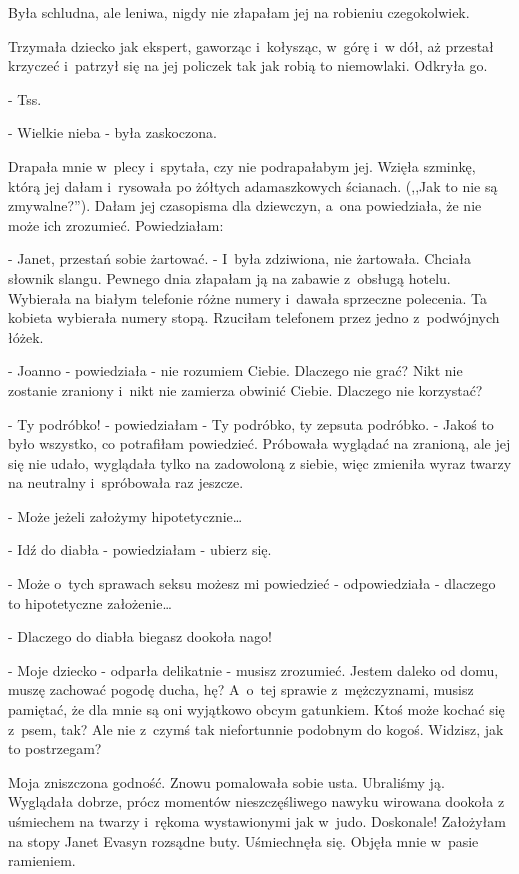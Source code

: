 \documentclass[oneside,polish,12pt,sfheadings]{mwbk}
\begin{document}
Była schludna, ale leniwa, nigdy nie złapałam jej na robieniu czegokolwiek.

Trzymała dziecko jak ekspert, gaworząc i~kołysząc, w~górę i~w dół,
aż przestał krzyczeć i~patrzył się na jej policzek tak jak robią to
niemowlaki. Odkryła go. 

- Tss.

- Wielkie nieba - była zaskoczona.

Drapała mnie w~plecy i~spytała, czy nie podrapałabym jej. Wzięła szminkę,
którą jej dałam i~rysowała po żółtych adamaszkowych ścianach. (,,Jak
to nie są zmywalne?''). Dałam jej czasopisma dla dziewczyn, a~ona powiedziała,
że nie może ich zrozumieć. Powiedziałam: 

- Janet, przestań sobie żartować. - I~była zdziwiona, nie żartowała. Chciała słownik slangu. Pewnego
dnia złapałam ją na zabawie z~obsługą hotelu. Wybierała na białym
telefonie różne numery i~dawała sprzeczne polecenia. Ta kobieta wybierała
numery stopą. Rzuciłam telefonem przez jedno z~podwójnych łóżek.

- Joanno - powiedziała - nie rozumiem Ciebie. Dlaczego nie grać? Nikt
nie zostanie zraniony i~nikt nie zamierza obwinić Ciebie. Dlaczego
nie korzystać?

- Ty podróbko! - powiedziałam - Ty podróbko, ty zepsuta podróbko. - Jakoś to było wszystko, co potrafiłam powiedzieć. Próbowała wyglądać
na zranioną, ale jej się nie udało, wyglądała tylko na zadowoloną
z siebie, więc zmieniła wyraz twarzy na neutralny i~spróbowała raz
jeszcze.

- Może jeżeli założymy hipotetycznie\ldots

- Idź do diabła - powiedziałam - ubierz się.

- Może o~tych sprawach seksu możesz mi powiedzieć - odpowiedziała
- dlaczego to hipotetyczne założenie\ldots

- Dlaczego do diabła biegasz dookoła nago!

- Moje dziecko - odparła delikatnie - musisz zrozumieć. Jestem daleko
od domu, muszę zachować pogodę ducha, hę? A~o~tej sprawie z~mężczyznami,
musisz pamiętać, że dla mnie są oni wyjątkowo obcym gatunkiem. Ktoś
może kochać się z~psem, tak? Ale nie z~czymś tak niefortunnie podobnym
do kogoś. Widzisz, jak to postrzegam?

Moja zniszczona godność. Znowu pomalowała sobie usta. Ubraliśmy ją.
Wyglądała dobrze, prócz momentów nieszczęśliwego nawyku wirowana dookoła
z uśmiechem na twarzy i~rękoma wystawionymi jak w~judo. Doskonale!
Założyłam na stopy Janet Evasyn rozsądne buty. Uśmiechnęła się. Objęła
mnie w~pasie ramieniem.
\end{document}
